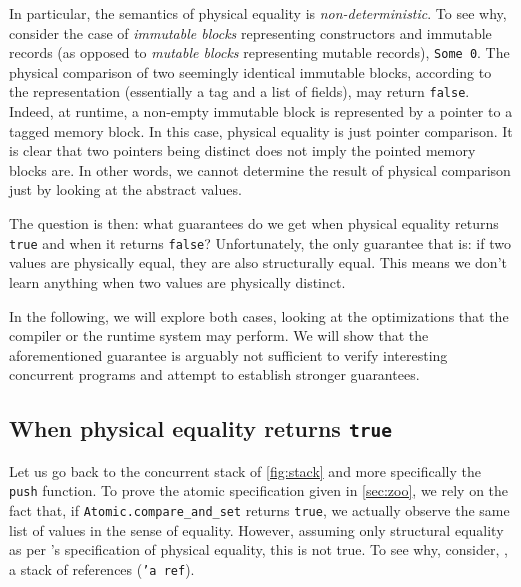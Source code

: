 In particular, the semantics of physical equality is \emph{non-deterministic}.
To see why, consider the case of \emph{immutable blocks} representing constructors and immutable records (as opposed to \emph{mutable blocks} representing mutable records), \eg \texttt{Some 0}.
The physical comparison of two seemingly identical immutable blocks, according to the \Rocq representation (essentially a tag and a list of fields), may return \texttt{false}.
Indeed, at runtime, a non-empty immutable block is represented by a pointer to a tagged memory block.
In this case, physical equality is just pointer comparison.
It is clear that two pointers being distinct does not imply the pointed memory blocks are.
In other words, we cannot determine the result of physical comparison just by looking at the abstract values.

The question is then: what guarantees do we get when physical equality returns \texttt{true} and when it returns \texttt{false}?
Unfortunately, the only guarantee that \OCaml {} is: if two values are physically equal, they are also structurally equal.
This means we don't learn anything when two values are physically distinct.

In the following, we will explore both cases, looking at the optimizations that the compiler or the runtime system may perform.
We will show that the aforementioned guarantee is arguably not sufficient to verify interesting concurrent programs and attempt to establish stronger guarantees.

\subsection{When physical equality returns \texttt{true}}

Let us go back to the concurrent stack of \cref{fig:stack} and more specifically the \texttt{push} function.
To prove the atomic specification given in \cref{sec:zoo}, we rely on the fact that, if \texttt{Atomic.compare_and_set} returns \texttt{true}, we actually observe the same list of values in the sense of \Rocq equality.
However, assuming only structural equality as per \OCaml's specification of physical equality, this is not true.
To see why, consider, \eg, a stack of references (\texttt{'a ref}).

